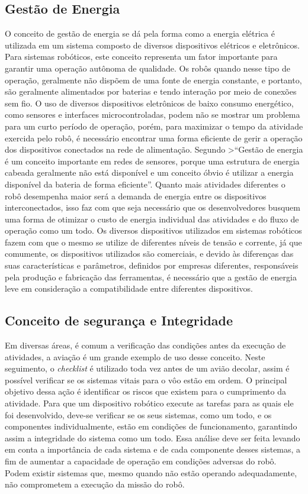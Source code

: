 \subsection{Gestão de Energia}\label{sec:gestao}
O conceito de gestão de energia se dá pela forma como a energia elétrica é utilizada em um sistema composto de diversos dispositivos elétricos e eletrônicos. Para sistemas robóticos, este conceito representa um fator importante para garantir uma operação autônoma de qualidade. Os robôs quando nesse tipo de operação, geralmente não dispõem de uma fonte de energia constante, e portanto, são geralmente alimentados por baterias e tendo interação por meio de conexões sem fio. 
O uso de diversos dispositivos eletrônicos de baixo consumo energético, como sensores e interfaces microcontroladas, podem não se mostrar um problema para um curto período de operação, porém, para maximizar o tempo da atividade exercida pelo robô, é necessário encontrar uma forma eficiente de gerir a operação dos dispositivos conectados na rede de alimentação. Segundo \cite{katiraei2006power} 
>“Gestão de energia é um conceito importante em redes de sensores, porque uma estrutura de energia cabeada geralmente não está disponível e um conceito óbvio é utilizar a energia disponível da bateria de forma eficiente”. 	
Quanto mais atividades diferentes o robô desempenha maior será a demanda de energia entre os dispositivos interconectados, isso faz com que seja necessário que os desenvolvedores busquem uma forma de otimizar o custo de energia individual das atividades e do fluxo de operação como um todo. Os diversos dispositivos utilizados em sistemas robóticos fazem com que o mesmo se utilize de diferentes níveis de tensão e corrente, já que comumente, os dispositivos utilizados são comerciais, e devido às diferenças das suas características e parâmetros, definidos por empresas diferentes, responsáveis pela produção e fabricação das ferramentas, é necessário que a gestão de energia leve em consideração a compatibilidade entre diferentes dispositivos.

\subsection{Conceito de segurança e Integridade}\label{sec:segur_inte}
Em diversas áreas, é comum a verificação das condições antes da execução de atividades, a aviação é um grande exemplo de uso desse conceito. Neste seguimento, o \textit{checklist} é utilizado toda vez antes de um avião decolar, assim é possível verificar se os sistemas vitais para o vôo estão em ordem. O principal objetivo dessa ação é identificar os riscos que existem para o cumprimento da atividade.
Para que um dispositivo robótico execute as tarefas para as quais ele foi desenvolvido, deve-se verificar se os seus sistemas, como um todo, e os componentes individualmente, estão em condições de funcionamento, garantindo assim a integridade do sistema como um todo. Essa análise deve ser feita levando em conta a importância de cada sistema e de cada componente desses sistemas, a fim de aumentar a capacidade de operação em condições adversas do robô. Podem existir sistemas que, mesmo quando não estão operando adequadamente, não comprometem a execução da missão do robô.

